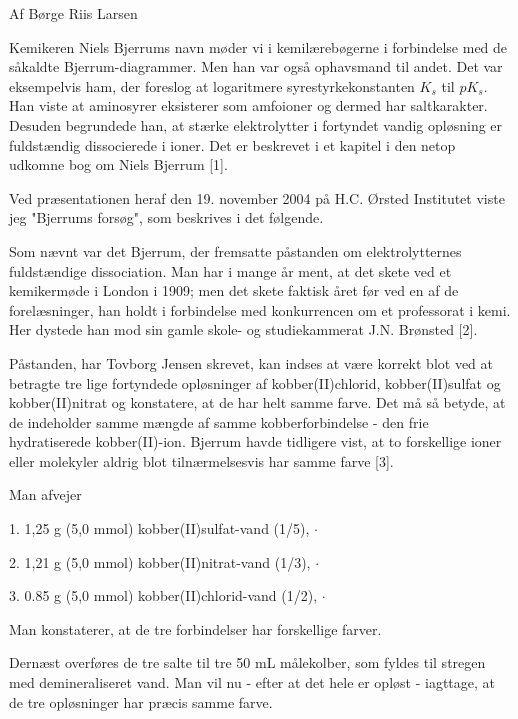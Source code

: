 


Af Børge Riis Larsen

Kemikeren Niels Bjerrums navn møder vi i kemilærebøgerne i forbindelse med de
såkaldte Bjerrum-diagrammer. Men han var også ophavsmand til andet. Det var
eksempelvis ham, der foreslog at logaritmere syrestyrkekonstanten $K_{s}$
til $pK_{s}$.
Han viste at aminosyrer eksisterer som amfoioner og dermed har saltkarakter.
Desuden begrundede han, at stærke elektrolytter i fortyndet vandig opløsning
er fuldstændig dissocierede i ioner. Det er beskrevet i et kapitel i den netop
udkomne bog om Niels Bjerrum [1].

Ved præsentationen heraf den 19. november 2004 på H.C. Ørsted Institutet viste
jeg "Bjerrums forsøg", som beskrives i det følgende.

Som nævnt var det Bjerrum, der fremsatte påstanden om elektrolytternes
fuldstændige dissociation. Man har i mange år ment, at det skete ved et
kemikermøde i London i 1909; men det skete faktisk året før ved en af de
forelæsninger, han holdt i forbindelse med konkurrencen om et professorat i
kemi. Her dystede han mod sin gamle skole- og studiekammerat J.N. Brønsted [2].

Påstanden, har Tovborg Jensen skrevet, kan indses at være korrekt blot ved at
betragte tre lige fortyndede opløsninger af kobber(II)chlorid, kobber(II)sulfat
og kobber(II)nitrat og konstatere, at de har helt samme farve. Det må så betyde,
at de indeholder samme mængde af samme kobberforbindelse - den frie hydratiserede
kobber(II)-ion. Bjerrum havde tidligere vist, at to forskellige ioner eller
molekyler aldrig blot tilnærmelsesvis har samme farve [3].




Man afvejer

1. 1,25 g (5,0 mmol) kobber(II)sulfat-vand (1/5), $\cdotp$

2. 1,21 g (5,0 mmol) kobber(II)nitrat-vand (1/3), $\cdotp$

3. 0.85 g (5,0 mmol) kobber(II)chlorid-vand (1/2), $\cdotp$

Man konstaterer, at de tre forbindelser har forskellige farver.

Dernæst overføres de tre salte til tre 50 mL målekolber, som fyldes til stregen
med demineraliseret vand. Man vil nu - efter at det hele er opløst - iagttage,
at de tre opløsninger har præcis samme farve.

